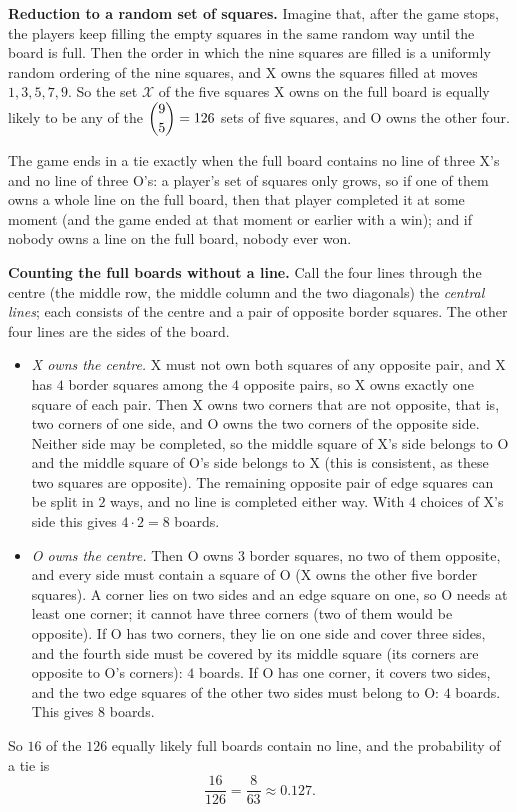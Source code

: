 \textbf{Reduction to a random set of squares.} Imagine that, after the game stops, the players keep filling the empty squares in the same random way until the board is full. Then the order in which the nine squares are filled is a uniformly random ordering of the nine squares, and X owns the squares filled at moves $1,3,5,7,9$. So the set $\mathcal X$ of the five squares X owns on the full board is equally likely to be any of the $\dbinom95=126$ sets of five squares, and O owns the other four.

The game ends in a tie exactly when the full board contains no line of three X's and no line of three O's: a player's set of squares only grows, so if one of them owns a whole line on the full board, then that player completed it at some moment (and the game ended at that moment or earlier with a win); and if nobody owns a line on the full board, nobody ever won.

\textbf{Counting the full boards without a line.} Call the four lines through the centre (the middle row, the middle column and the two diagonals) the \emph{central lines}; each consists of the centre and a pair of opposite border squares. The other four lines are the sides of the board.
\begin{itemize}
\item \emph{X owns the centre.} X must not own both squares of any opposite pair, and X has $4$ border squares among the $4$ opposite pairs, so X owns exactly one square of each pair. Then X owns two corners that are not opposite, that is, two corners of one side, and O owns the two corners of the opposite side. Neither side may be completed, so the middle square of X's side belongs to O and the middle square of O's side belongs to X (this is consistent, as these two squares are opposite). The remaining opposite pair of edge squares can be split in $2$ ways, and no line is completed either way. With $4$ choices of X's side this gives $4\cdot2=8$ boards.
\item \emph{O owns the centre.} Then O owns $3$ border squares, no two of them opposite, and every side must contain a square of O (X owns the other five border squares). A corner lies on two sides and an edge square on one, so O needs at least one corner; it cannot have three corners (two of them would be opposite). If O has two corners, they lie on one side and cover three sides, and the fourth side must be covered by its middle square (its corners are opposite to O's corners): $4$ boards. If O has one corner, it covers two sides, and the two edge squares of the other two sides must belong to O: $4$ boards. This gives $8$ boards.
\end{itemize}
So $16$ of the $126$ equally likely full boards contain no line, and the probability of a tie is
\[\dfrac{16}{126}=\boxed{\dfrac{8}{63}}\approx0.127.\]

